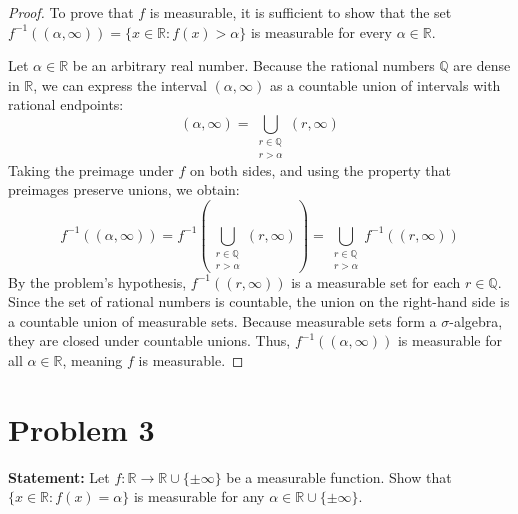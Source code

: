 \documentclass[12pt]{article}
\begin{document}
\begin{proof}
To prove that $f$ is measurable, it is sufficient to show that the set $f^{-1}((\alpha, \infty)) = \{x \in \mathbb{R} : f(x) > \alpha\}$ is measurable for every $\alpha \in \mathbb{R}$.

Let $\alpha \in \mathbb{R}$ be an arbitrary real number. Because the rational numbers $\mathbb{Q}$ are dense in $\mathbb{R}$, we can express the interval $(\alpha, \infty)$ as a countable union of intervals with rational endpoints:
\[
(\alpha, \infty) = \bigcup_{\substack{r \in \mathbb{Q} \\ r > \alpha}} (r, \infty)
\]
Taking the preimage under $f$ on both sides, and using the property that preimages preserve unions, we obtain:
\[
f^{-1}((\alpha, \infty)) = f^{-1}\left( \bigcup_{\substack{r \in \mathbb{Q} \\ r > \alpha}} (r, \infty) \right) = \bigcup_{\substack{r \in \mathbb{Q} \\ r > \alpha}} f^{-1}((r, \infty))
\]
By the problem's hypothesis, $f^{-1}((r, \infty))$ is a measurable set for each $r \in \mathbb{Q}$. Since the set of rational numbers is countable, the union on the right-hand side is a countable union of measurable sets. Because measurable sets form a $\sigma$-algebra, they are closed under countable unions. Thus, $f^{-1}((\alpha, \infty))$ is measurable for all $\alpha \in \mathbb{R}$, meaning $f$ is measurable.
\end{proof}

\section*{Problem 3}
\textbf{Statement:} Let $f:\mathbb{R}\rightarrow\mathbb{R}\cup\{\pm\infty\}$ be a measurable function. Show that $\{x \in\mathbb{R}:f(x)=\alpha\}$ is measurable for any $\alpha\in\mathbb{R}\cup\{\pm\infty\}$.
\end{document}
